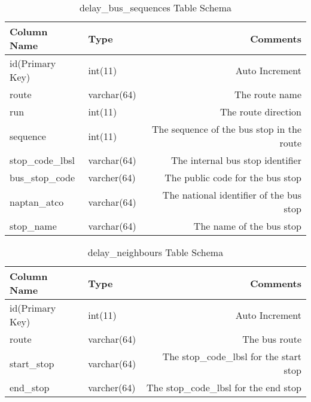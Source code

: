\begin{table}
\centering
\begin{tabular}{@{}llr@{}} \toprule
Column Name & Type & Comments\\ \midrule
id(Primary Key) & int(11)  & Auto Increment\\
route & varchar(64) &  The route name\\
run & int(11) & The route direction\\
sequence & int(11) & The sequence of the bus stop in the route\\
stop\_code\_lbsl & varchar(64) & The internal bus stop identifier\\
bus\_stop\_code & varcher(64) & The public code for the bus stop\\
naptan\_atco & varchar(64) & The national identifier of the bus stop\\
stop\_name & varchar(64) & The name of the bus stop\\ \bottomrule
\end{tabular}
\caption{delay\_bus\_sequences Table Schema}
\label{table:delay_bus_sequences}
\end{table}


\begin{table}
\centering
\begin{tabular}{@{}llr@{}} \toprule
Column Name & Type & Comments\\ \midrule
id(Primary Key) & int(11)  & Auto Increment\\
route & varchar(64) & The bus route \\
start\_stop & varchar(64) & The stop\_code\_lbsl for the start stop\\
end\_stop & varcher(64) & The stop\_code\_lbsl for the end stop\\ \bottomrule
\end{tabular}
\caption{delay\_neighbours Table Schema}
\label{table:delay_neighbours}
\end{table}
